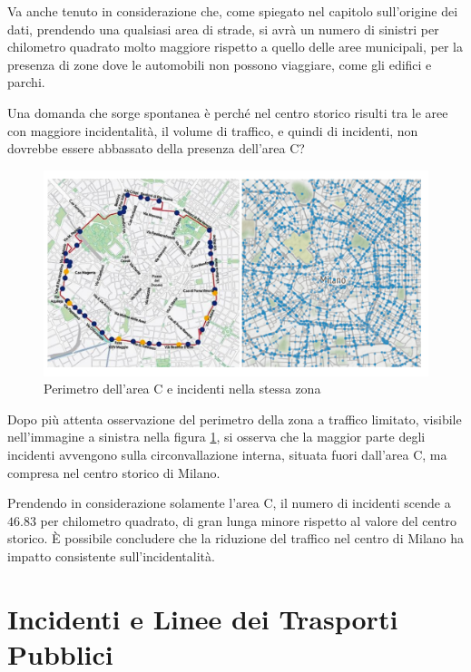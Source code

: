 \documentclass[a4paper,12pt]{report}
\begin{document}
Va anche tenuto in considerazione che, come spiegato nel capitolo sull'origine dei dati, 
prendendo una qualsiasi area di strade, si avrà un numero di sinistri per chilometro quadrato 
molto maggiore rispetto a quello delle aree municipali, per la presenza di zone dove  
le automobili non possono viaggiare, come gli edifici e parchi. 

Una domanda che sorge spontanea è perché nel centro storico risulti tra le aree con maggiore 
incidentalità, il volume di traffico, e quindi di incidenti, non dovrebbe essere abbassato 
della presenza dell'area C?

\begin{figure}
    \includegraphics[width=\linewidth]{../src/area_c/area_c_incidenti.png}
    \caption{Perimetro dell'area C e incidenti nella stessa zona}
    \label{fig:perimetro-area-c}
\end{figure}

Dopo più attenta osservazione del perimetro della zona a traffico limitato, 
visibile nell'immagine a sinistra nella 
figura \ref{fig:perimetro-area-c}, si osserva che la maggior parte degli 
incidenti avvengono sulla circonvallazione interna, 
situata fuori dall'area C, ma compresa nel centro storico di Milano. 

Prendendo in considerazione solamente l'area C, il numero di incidenti scende a $46.83$ 
per chilometro quadrato, di gran lunga minore rispetto al valore del centro storico. 
\`E possibile concludere che la riduzione del traffico nel centro di Milano ha impatto 
consistente sull'incidentalità. 

\section{Incidenti e Linee dei Trasporti Pubblici}
\end{document}
